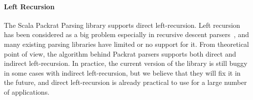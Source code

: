 \paragraph{Left Recursion} The Scala Packrat Parsing library 
supports direct left-recursion. Left recursion has been considered
as a big problem especially in recursive descent parsers~\cite{}, and many
existing parsing libraries have limited or no support for it. From theoretical point of
view, the algorithm behind Packrat parsers supports both direct and
indirect left-recursion. In practice, the current version of the library is still
buggy in some cases with indirect left-recursion, but we believe that
they will fix it in the future, and direct left-recursion is
already practical to use for a large number of applications.
